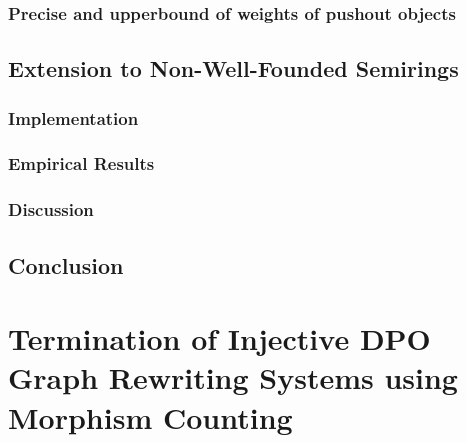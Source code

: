 \documentclass{report}
\begin{document}
\subsection{Precise and upperbound of weights of pushout objects} 
\label{sec:type_graph:wf:weighing_pushout} 
   

     
  
\section{Extension to Non-Well-Founded Semirings}
\label{sec:type_graph:extension_nwf}

 

\subsection{Implementation}
\label{nwf:sec:type_graph:implementation}
 

\subsection{Empirical Results}
\label{nwf:sec:type_graph:result}
 

\subsection{Discussion}
\label{nwf:sec:type_graph:related_work}


\section{Conclusion}
\label{nwf:sec:type_graph:conclusion}

  
\chapter{Termination of Injective DPO Graph Rewriting
Systems using Morphism Counting}
\label{chap:subgraph_counting}

\label{subgraph_counting:sec:intro}

\end{document}
